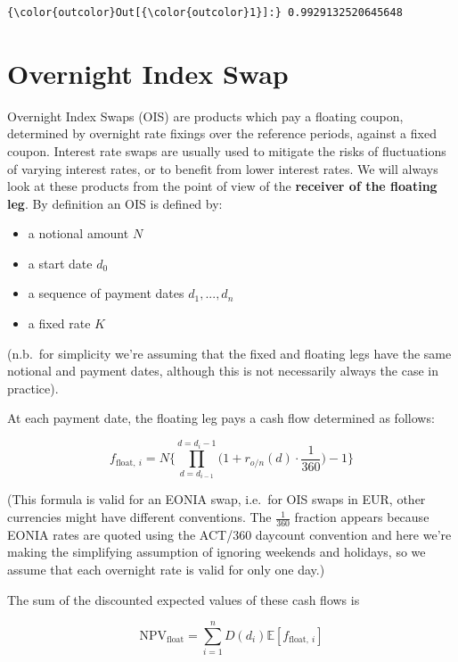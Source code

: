 \documentclass[11pt]{article}
\providecommand{\tightlist}{%
      \setlength{\itemsep}{0pt}\setlength{\parskip}{0pt}}
\begin{document}
\begin{Verbatim}[commandchars=\\\{\}]
{\color{outcolor}Out[{\color{outcolor}1}]:} 0.9929132520645648
\end{Verbatim}
            
    \hypertarget{overnight-index-swap}{%
\section{Overnight Index Swap}\label{overnight-index-swap}}

Overnight Index Swaps (OIS) are products which pay a floating coupon,
determined by overnight rate fixings over the reference periods, against
a fixed coupon. Interest rate swaps are usually used to mitigate the
risks of fluctuations of varying interest rates, or to benefit from
lower interest rates. We will always look at these products from the
point of view of the \textbf{receiver of the floating leg}. By
definition an OIS is defined by:

\begin{itemize}
\tightlist
\item
  a notional amount \(N\)
\item
  a start date \(d_0\)
\item
  a sequence of payment dates \(d_1,...,d_n\)
\item
  a fixed rate \(K\)
\end{itemize}

(n.b.~for simplicity we're assuming that the fixed and floating legs
have the same notional and payment dates, although this is not
necessarily always the case in practice).

At each payment date, the floating leg pays a cash flow determined as
follows:

\[f_{\mathrm{float},~i} = N \Bigg\{\prod_{d=d_{i-1}}^{d=d_i-1}\Big(1+r_{o/n}(d)\cdot\frac{1}{360}\Big) -1 \Bigg\}\]

(This formula is valid for an EONIA swap, i.e.~for OIS swaps in EUR,
other currencies might have different conventions. The \(\frac{1}{360}\)
fraction appears because EONIA rates are quoted using the ACT/360
daycount convention and here we're making the simplifying assumption of
ignoring weekends and holidays, so we assume that each overnight rate is
valid for only one day.)

The sum of the discounted expected values of these cash flows is

\[\mathrm{NPV}_{\mathrm{float}} = \sum_{i=1}^{n}D(d_i)\mathbb{E}[f_{\mathrm{float},~i}]\]
\end{document}
